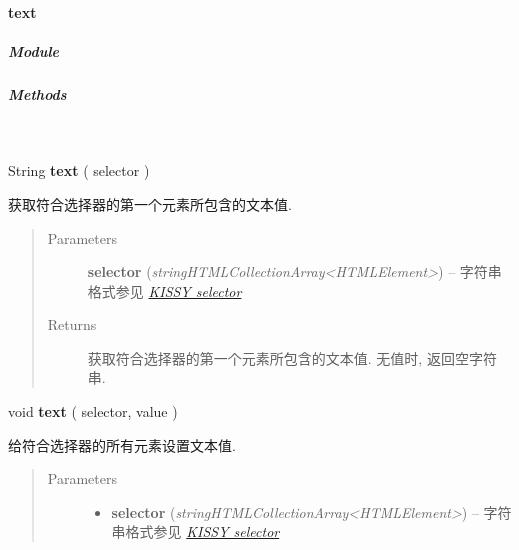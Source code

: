 \documentclass[letterpaper,10pt,english]{sphinxmanual}
\begin{document}
\paragraph{text}
\label{api/core/dom/text:text}\label{api/core/dom/text::doc}

\subparagraph{Module}
\label{api/core/dom/text:module}\begin{quote}

{\hyperref[api/core/dom/index:module-DOM]{}}
\end{quote}


\subparagraph{Methods}
\label{api/core/dom/text:methods}

\begin{fulllineitems}
\label{api/core/dom/text:DOM.text}~
\begin{DUlineblock}{0em}
\item[] String \textbf{text} ( selector )
\item[] 获取符合选择器的第一个元素所包含的文本值.
\end{DUlineblock}
\begin{quote}\begin{description}
\item[{Parameters}] \leavevmode
\textbf{selector} (\emph{string\textbar{}HTMLCollection\textbar{}Array\textless{}HTMLElement\textgreater{}}) -- 字符串格式参见 {\hyperref[api/core/dom/selector:dom-selector]{\emph{KISSY selector}}}

\item[{Returns}] \leavevmode
获取符合选择器的第一个元素所包含的文本值. 无值时, 返回空字符串.

\end{description}\end{quote}

\begin{DUlineblock}{0em}
\item[] void \textbf{text} ( selector, value )
\item[] 给符合选择器的所有元素设置文本值.
\end{DUlineblock}
\begin{quote}\begin{description}
\item[{Parameters}] \leavevmode\begin{itemize}
\item {}
\textbf{selector} (\emph{string\textbar{}HTMLCollection\textbar{}Array\textless{}HTMLElement\textgreater{}}) -- 字符串格式参见 {\hyperref[api/core/dom/selector:dom-selector]{\emph{KISSY selector}}}


\end{itemize}
\end{description}
\end{quote}
\end{fulllineitems}
\end{document}
